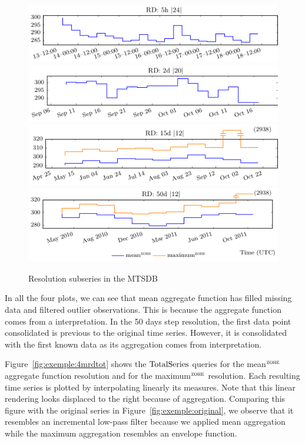 \begin{figure}[tp]
  \centering
  \includegraphics{fig_exemple_4mrd1.pdf}
  \includegraphics{fig_exemple_4mrd2.pdf}
  \includegraphics{fig_exemple_4mrd3.pdf}
  \includegraphics{fig_exemple_4mrd4.pdf}
  \caption{Resolution subseries in the MTSDB}
  \label{fig:exemple:4mrd}
\end{figure}

In all the four plots, we can see that mean aggregate function has
filled missing data and filtered outlier observations. This is
because the aggregate function comes from a \zohe{} interpretation.
In the 50 days step resolution, the first data point consolidated is
previous to the original time series. However, it is consolidated with
the first known data as its aggregation comes from \zohe{}
interpretation.

Figure~\ref{fig:exemple:4mrdtot} shows the $\operatorname{TotalSeries}$ queries for
the mean$^{\zohe}$ aggregate function resolution and for the
maximum$^{\zohe}$ resolution.  Each resulting time series is plotted
by interpolating linearly its measures. Note that this linear
rendering looks displaced to the right because of \zohe{} aggregation.
Comparing this figure with the original series in
Figure~\ref{fig:exemple:original}, we observe that it resembles an
incremental low-pass filter because we applied mean aggregation while
the maximum aggregation resembles an envelope function.

